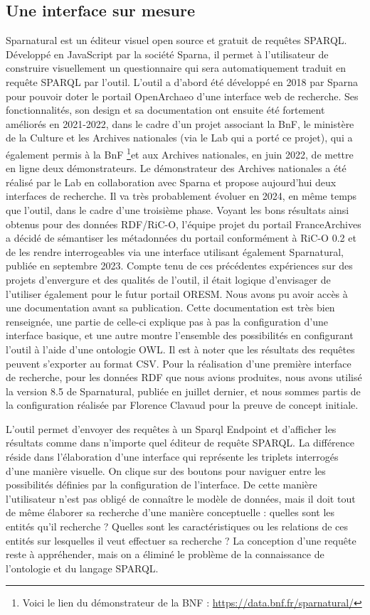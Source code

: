 \subsection{Une interface sur mesure}
Sparnatural est un éditeur visuel open source et gratuit de requêtes SPARQL. Développé en JavaScript par 
la société Sparna, il permet à l'utilisateur de construire visuellement un questionnaire qui sera automatiquement traduit en requête SPARQL par l'outil. L'outil a d'abord été développé en 2018 par Sparna pour pouvoir doter le portail OpenArchaeo d'une interface web de recherche. Ses fonctionnalités, son design et sa documentation ont ensuite été fortement améliorés en 2021-2022, dans le cadre d'un projet associant la BnF, le ministère de la Culture et les Archives nationales (via le Lab qui a porté ce projet), qui a également permis à la BnF \footnote{Voici le lien du démonstrateur de la BNF : \href{https://data.bnf.fr/sparnatural/}{https://data.bnf.fr/sparnatural/}}et aux Archives nationales, en juin 2022, de mettre en ligne deux démonstrateurs. Le démonstrateur des Archives nationales a été réalisé par le Lab en collaboration avec Sparna et propose aujourd'hui deux interfaces de recherche. Il va très probablement évoluer en 2024, en même temps que l'outil, dans le cadre d'une troisième phase. Voyant les bons résultats ainsi obtenus pour des données RDF/RiC-O, l'équipe projet du portail FranceArchives a décidé de sémantiser les métadonnées du portail conformément à RiC-O 0.2 et de les rendre interrogeables via une interface utilisant également Sparnatural, publiée en septembre 2023. Compte tenu de ces précédentes expériences sur des projets d'envergure et des qualités de l'outil, il était logique d'envisager de l'utiliser également pour le futur portail ORESM. Nous avons pu avoir accès à une documentation avant sa publication. Cette documentation est très bien renseignée, une partie de celle-ci explique pas à pas la configuration d'une interface basique, et une autre montre l'ensemble des possibilités en configurant l'outil à l'aide d'une ontologie OWL. Il est à noter que les résultats des requêtes peuvent s'exporter au format CSV. Pour la réalisation d'une première interface de recherche, pour les données RDF que nous avions produites, nous avons utilisé la version 8.5 de Sparnatural, publiée en juillet dernier, et nous sommes partis de la configuration réalisée par Florence Clavaud pour la preuve de concept initiale.
\par
L'outil permet d'envoyer des requêtes à un Sparql Endpoint et d'afficher les résultats comme dans n'importe quel éditeur de requête SPARQL. La différence réside dans l'élaboration d'une interface qui représente les triplets interrogés d'une manière visuelle. On clique sur des boutons pour naviguer entre les possibilités définies par la configuration de l'interface. De cette manière l'utilisateur n'est pas obligé de connaître le modèle de données, mais il doit tout de même élaborer sa recherche d'une manière conceptuelle : quelles sont les entités qu'il recherche ? Quelles sont les caractéristiques ou les relations de ces entités sur lesquelles il veut effectuer sa recherche ? La conception d'une requête reste à appréhender, mais on a éliminé le problème de la connaissance de l'ontologie et du langage SPARQL. 
